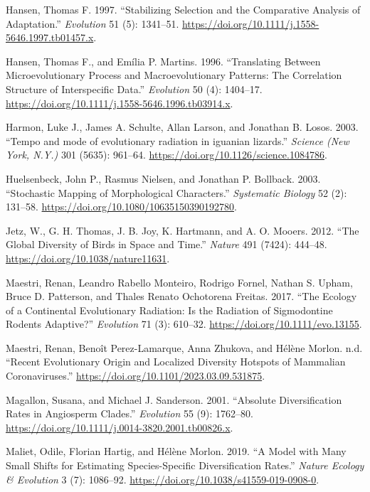 \documentclass[
]{book}
\newlength{\cslhangindent}
\newenvironment{CSLReferences}[2] %
 {\begin{list}{}{%
  \setlength{\itemindent}{0pt}
  \setlength{\leftmargin}{0pt}
  \setlength{\parsep}{0pt}
  \ifodd #1
   \setlength{\leftmargin}{\cslhangindent}
   \setlength{\itemindent}{-1\cslhangindent}
  \fi
  \setlength{\itemsep}{#2\baselineskip}}}
 {\end{list}}
\begin{document}
\begin{CSLReferences}{1}{0}
Hansen, Thomas F. 1997. {``Stabilizing Selection and the Comparative Analysis of Adaptation.''} \emph{Evolution} 51 (5): 1341--51. \url{https://doi.org/10.1111/j.1558-5646.1997.tb01457.x}.

Hansen, Thomas F., and Emília P. Martins. 1996. {``Translating Between Microevolutionary Process and Macroevolutionary Patterns: The Correlation Structure of Interspecific Data.''} \emph{Evolution} 50 (4): 1404--17. \url{https://doi.org/10.1111/j.1558-5646.1996.tb03914.x}.

Harmon, Luke J., James A. Schulte, Allan Larson, and Jonathan B. Losos. 2003. {``Tempo and mode of evolutionary radiation in iguanian lizards.''} \emph{Science (New York, N.Y.)} 301 (5635): 961--64. \url{https://doi.org/10.1126/science.1084786}.

Huelsenbeck, John P., Rasmus Nielsen, and Jonathan P. Bollback. 2003. {``Stochastic Mapping of Morphological Characters.''} \emph{Systematic Biology} 52 (2): 131--58. \url{https://doi.org/10.1080/10635150390192780}.

Jetz, W., G. H. Thomas, J. B. Joy, K. Hartmann, and A. O. Mooers. 2012. {``The Global Diversity of Birds in Space and Time.''} \emph{Nature} 491 (7424): 444--48. \url{https://doi.org/10.1038/nature11631}.

Maestri, Renan, Leandro Rabello Monteiro, Rodrigo Fornel, Nathan S. Upham, Bruce D. Patterson, and Thales Renato Ochotorena Freitas. 2017. {``The Ecology of a Continental Evolutionary Radiation: Is the Radiation of Sigmodontine Rodents Adaptive?''} \emph{Evolution} 71 (3): 610--32. \url{https://doi.org/10.1111/evo.13155}.

Maestri, Renan, Benoît Perez-Lamarque, Anna Zhukova, and Hélène Morlon. n.d. {``Recent Evolutionary Origin and Localized Diversity Hotspots of Mammalian Coronaviruses.''} \url{https://doi.org/10.1101/2023.03.09.531875}.

Magallon, Susana, and Michael J. Sanderson. 2001. {``Absolute Diversification Rates in Angiosperm Clades.''} \emph{Evolution} 55 (9): 1762--80. \url{https://doi.org/10.1111/j.0014-3820.2001.tb00826.x}.

Maliet, Odile, Florian Hartig, and Hélène Morlon. 2019. {``A Model with Many Small Shifts for Estimating Species-Specific Diversification Rates.''} \emph{Nature Ecology \& Evolution} 3 (7): 1086--92. \url{https://doi.org/10.1038/s41559-019-0908-0}.


\end{CSLReferences}
\end{document}
